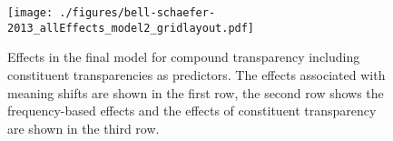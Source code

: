 \begin{figure}[H]
  \centering
\texttt{[image: ./figures/bell-schaefer-2013\_allEffects\_model2\_gridlayout.pdf]}
  
  \caption{Effects in the final model for compound transparency
    including constituent transparencies as predictors. The effects associated with meaning
    shifts are shown in the first row, the second row shows the frequency-based
  effects and the effects of constituent transparency are shown in the third row.}
\label{fig:bellschaefer2013_model_2}
\end{figure}




% 



